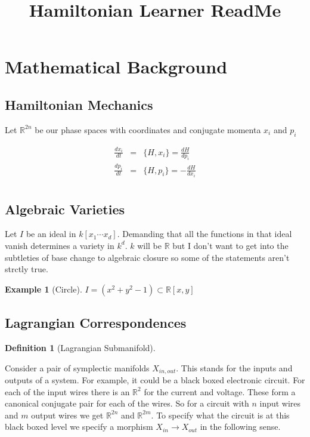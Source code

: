 \documentclass[a4paper,landscape]{article}
\title{Hamiltonian Learner ReadMe}
\theoremstyle{change}
\newtheorem{definition}[equation]{Definition}
\newtheorem{example}[equation]{Example}
\theoremstyle{nonumberplain}
\numberwithin{equation}{section}
\newcommand\setof[1]{\{ #1 \}}
\begin{document}
\maketitle

\section{Mathematical Background}

\subsection{Hamiltonian Mechanics}

Let $\mathbb{R}^{2n}$ be our phase spaces with coordinates and conjugate momenta $x_i$ and $p_i$

\begin{eqnarray*}
\frac{dx_i}{dt} &=& \setof{H,x_i} = \frac{dH}{dp_i}\\
\frac{dp_i}{dt} &=& \setof{H,p_i} = - \frac{dH}{dx_i}\\
\end{eqnarray*}

\subsection{Algebraic Varieties}

Let $I$ be an ideal in $k[x_1 \cdots x_d]$. Demanding that all the functions in that ideal vanish determines a variety in $k^d$. $k$ will be $\mathbb{R}$ but I don't want to get into the subtleties of base change to algebraic closure so some of the statements aren't strctly true.

\begin{example}[Circle]
$I = (x^2 + y^2 - 1) \subset \mathbb{R}[x,y]$
\end{example}

\subsection{Lagrangian Correspondences}

\begin{definition}[Lagrangian Submanifold]
\end{definition}

Consider a pair of symplectic manifolds $X_{in,out}$. This stands for the inputs and outputs of a system. For example, it could be a black boxed electronic circuit. For each of the input wires there is an $\mathbb{R}^2$ for the current and voltage. These form a canonical conjugate pair for each of the wires. So for a circuit with $n$ input wires and $m$ output wires we get $\mathbb{R}^{2n}$ and $\mathbb{R}^{2m}$. To specify what the circuit is at this black boxed level we specify a morphism $X_{in} \to X_{out}$ in the following sense.
\end{document}
